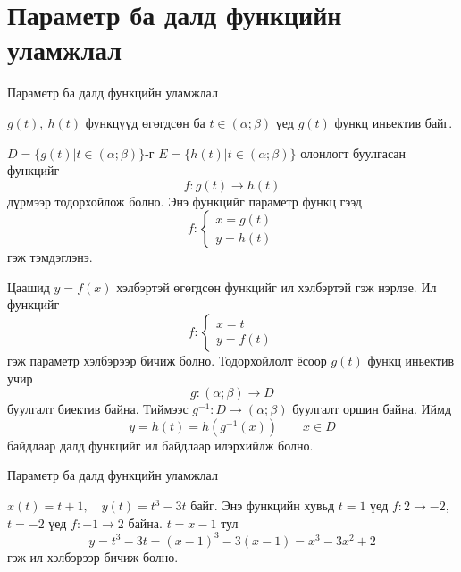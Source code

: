 

\section{Параметр ба далд функцийн уламжлал}
\begin{frame}[allowframebreaks]{Параметр ба далд функцийн уламжлал}
\begin{definition}
 $g(t),\ h(t)$ функцүүд өгөгдсөн ба $t\in(\alpha;\beta)$ үед $g(t)$ функц иньектив  байг.
 
 $D=\{g(t)|t\in(\alpha;\beta)\}$-г  $E=\{h(t)|t\in(\alpha;\beta)\}$ олонлогт буулгасан функцийг 
 $$f: g(t)\to h(t)$$ дүрмээр тодорхойлож болно. Энэ функцийг параметр функц гээд 
 $$ f:
 \begin{cases}
     x=g(t)\\
     y=h(t)
 \end{cases}$$ гэж тэмдэглэнэ. 
\end{definition}
Цаашид $y=f(x)$ хэлбэртэй өгөгдсөн функцийг ил хэлбэртэй гэж нэрлэе. Ил функцийг $$ f:
 \begin{cases}
     x=t\\
     y=f(t)
 \end{cases}$$ гэж параметр хэлбэрээр бичиж болно. Тодорхойлолт ёсоор $g(t)$ функц иньектив учир $$g: (\alpha;\beta)\to D$$ буулгалт биектив байна. Тиймээс $g^{-1}: D\to (\alpha;\beta)$ буулгалт оршин байна. Иймд 
 $$y=h(t)=h(g^{-1}(x))\qquad x\in D$$ байдлаар далд функцийг ил байдлаар илэрхийлж болно.
\end{frame}

\begin{frame}[allowframebreaks]{Параметр ба далд функцийн уламжлал}
 \begin{example}
$x(t)=t+1,\quad y(t)=t^3-3t$ байг. Энэ функцийн хувьд $t=1$ үед $f:2\to -2$, $t=-2$ үед $f:-1\to 2$ байна. $t=x-1$ тул 
\[y=t^3-3t=(x-1)^3-3(x-1)=x^3-3x^2+2
\] гэж ил хэлбэрээр бичиж болно.
\end{example}
\end{frame}

